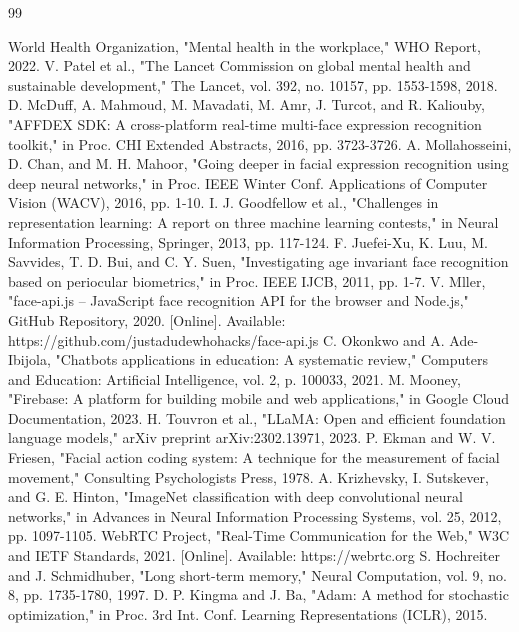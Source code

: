 \documentclass[conference]{IEEEtran}
\begin{document}
\begin{thebibliography}{99}

 World Health Organization, "Mental health in the workplace," WHO Report, 2022.
 V. Patel et al., "The Lancet Commission on global mental health and sustainable development," The Lancet, vol. 392, no. 10157, pp. 1553-1598, 2018.
 D. McDuff, A. Mahmoud, M. Mavadati, M. Amr, J. Turcot, and R. Kaliouby, "AFFDEX SDK: A cross-platform real-time multi-face expression recognition toolkit," in Proc. CHI Extended Abstracts, 2016, pp. 3723-3726.
 A. Mollahosseini, D. Chan, and M. H. Mahoor, "Going deeper in facial expression recognition using deep neural networks," in Proc. IEEE Winter Conf. Applications of Computer Vision (WACV), 2016, pp. 1-10.
 I. J. Goodfellow et al., "Challenges in representation learning: A report on three machine learning contests," in Neural Information Processing, Springer, 2013, pp. 117-124.
 F. Juefei-Xu, K. Luu, M. Savvides, T. D. Bui, and C. Y. Suen, "Investigating age invariant face recognition based on periocular biometrics," in Proc. IEEE IJCB, 2011, pp. 1-7.
 V. Mller, "face-api.js -- JavaScript face recognition API for the browser and Node.js," GitHub Repository, 2020. [Online]. Available: https://github.com/justadudewhohacks/face-api.js
 C. Okonkwo and A. Ade-Ibijola, "Chatbots applications in education: A systematic review," Computers and Education: Artificial Intelligence, vol. 2, p. 100033, 2021.
 M. Mooney, "Firebase: A platform for building mobile and web applications," in Google Cloud Documentation, 2023.
 H. Touvron et al., "LLaMA: Open and efficient foundation language models," arXiv preprint arXiv:2302.13971, 2023.
 P. Ekman and W. V. Friesen, "Facial action coding system: A technique for the measurement of facial movement," Consulting Psychologists Press, 1978.
 A. Krizhevsky, I. Sutskever, and G. E. Hinton, "ImageNet classification with deep convolutional neural networks," in Advances in Neural Information Processing Systems, vol. 25, 2012, pp. 1097-1105.
 WebRTC Project, "Real-Time Communication for the Web," W3C and IETF Standards, 2021. [Online]. Available: https://webrtc.org
 S. Hochreiter and J. Schmidhuber, "Long short-term memory," Neural Computation, vol. 9, no. 8, pp. 1735-1780, 1997.
 D. P. Kingma and J. Ba, "Adam: A method for stochastic optimization," in Proc. 3rd Int. Conf. Learning Representations (ICLR), 2015.
\end{thebibliography}
\end{document}

